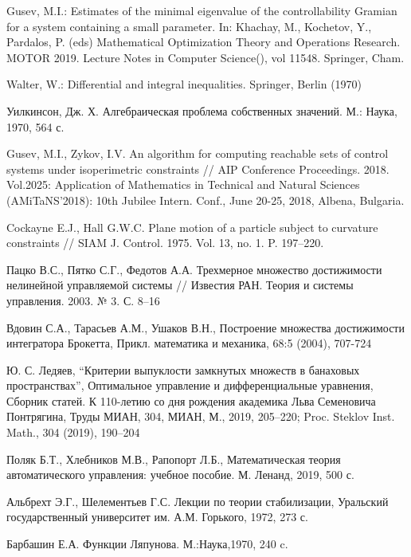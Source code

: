\documentclass[../main.tex]{subfiles}
\begin{document}
\begin{thebibliography}{99}
Gusev, M.I.: Estimates of the minimal eigenvalue of the controllability Gramian for a system containing a small parameter.  In: 
Khachay, M., Kochetov, Y., Pardalos, P. (eds) Mathematical Optimization Theory and Operations Research. MOTOR 
2019. Lecture Notes in Computer Science(), vol 11548. Springer, Cham. 

Walter, W.: Differential and integral inequalities. Springer, Berlin (1970)

Уилкинсон, Дж. Х.
Алгебраическая проблема собственных значений.
М.: Наука, 1970, 564 с.

Gusev, M.I., Zykov, I.V.
An algorithm for computing reachable sets of control systems under isoperimetric constraints // AIP Conference Proceedings. 
2018. 
Vol.2025: Application of Mathematics in Technical and Natural Sciences 
(AMiTaNS'2018): 10th Jubilee Intern. Conf.,
 June 20-25, 2018, Albena, Bulgaria.

 Cockayne E.J., Hall G.W.C. Plane motion of a particle subject to curvature constraints // SIAM J. Control. 1975. Vol. 13, no. 1. P. 197--220.  

 Пацко В.С., Пятко С.Г., Федотов А.А. Трехмерное множество достижимости нелинейной управляемой системы // Известия РАН. Теория и системы управления. 2003. № 3. С. 8--16

 Вдовин С.А., Тарасьев А.М., Ушаков В.Н., Построение множества достижимости интегратора Брокетта, Прикл. математика и механика, 68:5 (2004), 707-724

 Ю. С. Ледяев, “Критерии выпуклости замкнутых множеств в банаховых пространствах”, Оптимальное управление и дифференциальные уравнения, Сборник статей. К 110-летию со дня рождения академика Льва Семеновича Понтрягина, Труды МИАН, 304, МИАН, М., 2019, 205–220; Proc. Steklov Inst. Math., 304 (2019), 190–204

 Поляк Б.Т., Хлебников М.В., Рапопорт Л.Б., Математическая теория автоматического управления: учебное пособие. М. Ленанд, 2019, 500 с.

 Альбрехт Э.Г., Шелементьев Г.С. Лекции по теории стабилизации, Уральский государственный университет им. А.М. Горького, 1972, 273 с.

Барбашин Е.А. Функции Ляпунова. М.:Наука,1970, 240 c.


\end{thebibliography}
\end{document}

